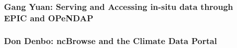 \subsubsection{Gang Yuan:  Serving and Accessing in-situ data through EPIC
      and \ac{OPeNDAP}}

\subsubsection{Don Denbo:  ncBrowse and the Climate Data Portal}

%
%
%
